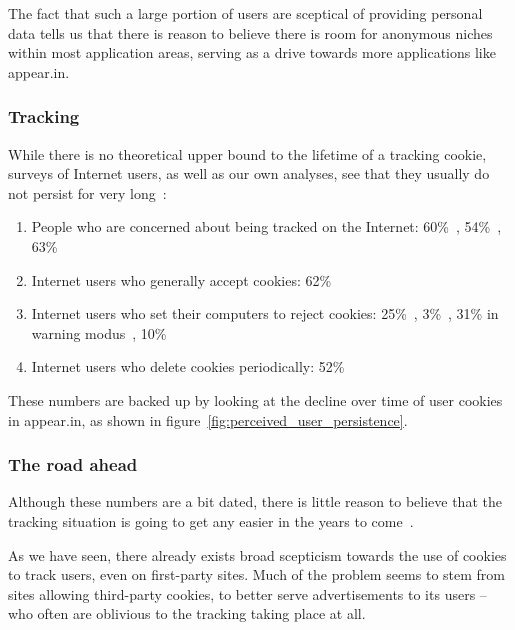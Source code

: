       The fact that such a large portion of users are sceptical of providing personal data tells us that there is reason to believe there is room for anonymous niches within most application areas, serving as a drive towards more applications like appear.in.

    \subsubsection{Tracking}

      While there is no theoretical upper bound to the lifetime of a tracking cookie, surveys of Internet users, as well as our own analyses, see that they usually do not persist for very long~\cite{Teltzrow2004}:

      \begin{enumerate}
        \item People who are concerned about being tracked on the Internet: 60\%~\cite{CyberDialogue2001}, 54\%~\cite{Fox2000}, 63\%~\cite{Harris2000}
        \item Internet users who generally accept cookies: 62\%~\cite{PersonalizationConsortium2000}
        \item Internet users who set their computers to reject cookies: 25\%~\cite{Culnan2001}, 3\%~\cite{CyberDialogue2001}, 31\% in warning modus~\cite{CyberDialogue2001}, 10\%\cite{Fox2000}
        \item Internet users who delete cookies periodically: 52\%~\cite{PersonalizationConsortium2000}
      \end{enumerate}

      These numbers are backed up by looking at the decline over time of user cookies in appear.in, as shown in figure~\ref{fig:perceived_user_persistence}.

    \subsubsection{The road ahead}

      Although these numbers are a bit dated, there is little reason to believe that the tracking situation is going to get any easier in the years to come~\cite{RuizMartinez2012,Nikiforakis2013,Sorensen2013,Eijk2011}.

      As we have seen, there already exists broad scepticism towards the use of cookies to track users, even on first-party sites. Much of the problem seems to stem from sites allowing third-party cookies, to better serve advertisements to its users -- who often are oblivious to the tracking taking place at all.

